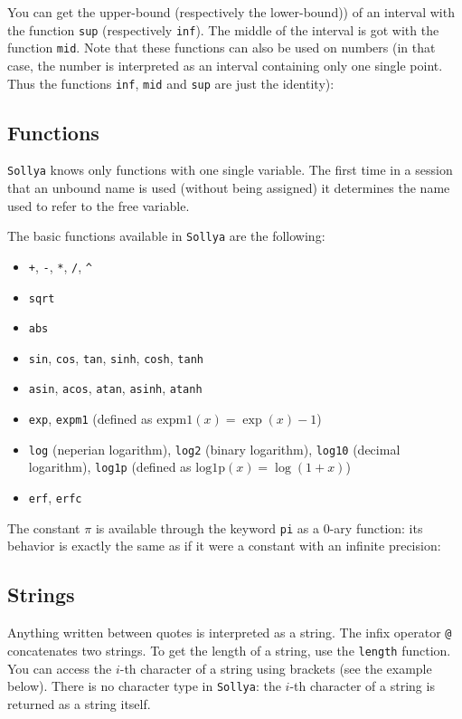 \documentclass[a4paper]{article}
\newcommand{\com}[1]{\texttt{#1}}
\newcommand{\key}[1]{\texttt{#1}}
\newcommand{\sollya}{\texttt{Sollya}\xspace}
\begin{document}


You can get the upper-bound (respectively the lower-bound)) of an interval with the function \com{sup} (respectively \com{inf}). The middle of the interval is got with the function \com{mid}. Note that these functions can also be used on numbers (in that case, the number is interpreted as an interval containing only one single point. Thus the functions \com{inf}, \com{mid} and \com{sup} are just the identity):



\subsection{Functions}
\sollya knows only functions with one single variable. The first time in a session that an unbound name is used (without being assigned) it determines the name used to refer to the free variable.

The basic functions available in \sollya are the following:
\begin{itemize}
\item \com{+}, \com{-}, \com{*}, \com{/}, \com{\^{}}
\item \com{sqrt}
\item \com{abs}
\item \com{sin}, \com{cos}, \com{tan}, \com{sinh}, \com{cosh}, \com{tanh}
\item \com{asin}, \com{acos}, \com{atan}, \com{asinh}, \com{atanh}
\item \com{exp}, \com{expm1} (defined as $\mathrm{expm1}(x) = \exp(x)-1$)
\item \com{log} (neperian logarithm), \com{log2} (binary logarithm), \com{log10} (decimal logarithm), \com{log1p} (defined as $\mathrm{log1p}(x) = \log(1+x)$)
\item \com{erf}, \com{erfc}
\end{itemize}

The constant $\pi$ is available through the keyword \key{pi} as a $0$-ary function: its behavior is exactly the same as if it were a constant with an infinite precision:



\subsection{Strings}
Anything written between quotes is interpreted as a string. The infix operator \com{@} concatenates two strings. To get the length of a string, use the \com{length} function. You can access the $i$-th character of a string using brackets (see the example below). There is no character type in \sollya: the $i$-th character of a string is returned as a string itself.
\end{document}
